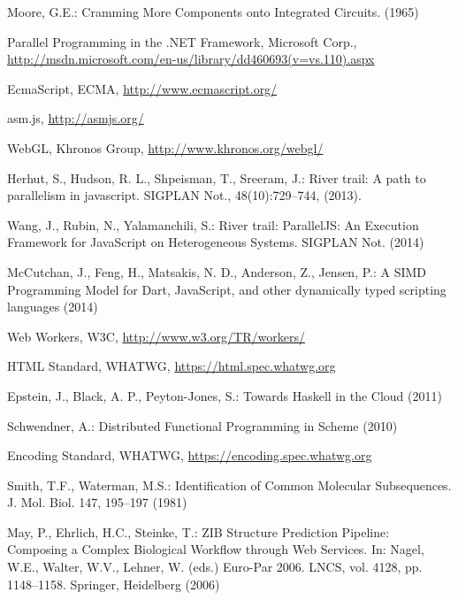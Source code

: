 \documentclass[runningheads,a4paper]{llncs}
\begin{document}
\begin{thebibliography}{4}

 Moore, G.E.: Cramming More Components onto Integrated Circuits. (1965)

 Parallel Programming in the .NET Framework, Microsoft Corp., \url{http://msdn.microsoft.com/en-us/library/dd460693(v=vs.110).aspx}

 EcmaScript, ECMA, \url{http://www.ecmascript.org/}

 asm.js, \url{http://asmjs.org/}

 WebGL, Khronos Group, \url{http://www.khronos.org/webgl/}

 Herhut, S., Hudson, R. L., Shpeisman, T., Sreeram, J.: River trail: A path to parallelism in javascript. SIGPLAN Not., 48(10):729--744, (2013).

 Wang, J., Rubin, N., Yalamanchili, S.: River trail: ParallelJS: An Execution Framework for JavaScript on Heterogeneous Systems. SIGPLAN Not. (2014)

 McCutchan, J., Feng, H., Matsakis, N. D., Anderson, Z., Jensen, P.: A SIMD Programming Model for Dart, JavaScript, and other dynamically typed scripting languages (2014)

 Web Workers, W3C, \url{http://www.w3.org/TR/workers/}

 HTML Standard, WHATWG, \url{https://html.spec.whatwg.org}

 Epstein, J., Black, A. P., Peyton-Jones, S.: Towards Haskell in the Cloud (2011)

 Schwendner, A.: Distributed Functional Programming in Scheme (2010)

 Encoding Standard, WHATWG, \url{https://encoding.spec.whatwg.org}


 Smith, T.F., Waterman, M.S.: Identification of Common Molecular
Subsequences. J. Mol. Biol. 147, 195--197 (1981)

 May, P., Ehrlich, H.C., Steinke, T.: ZIB Structure Prediction Pipeline:
Composing a Complex Biological Workflow through Web Services. In: Nagel,
W.E., Walter, W.V., Lehner, W. (eds.) Euro-Par 2006. LNCS, vol. 4128,
pp. 1148--1158. Springer, Heidelberg (2006)


\end{thebibliography}
\end{document}
